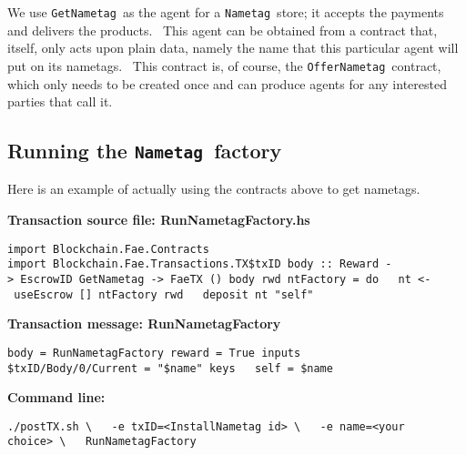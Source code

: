 \documentclass[11pt]{article}
\newcommand{\codeblock}[1]{\begin{mdframed}[
    backgroundcolor=header-color,
    linecolor=header-color,
    innertopmargin=10pt,
    ]{\texttt{#1}}\end{mdframed}}
\begin{document}

\vspace{11pt}

We use \texttt{GetNametag} as the agent for a \texttt{Nametag} store; it accepts the payments and delivers the products.  This agent can be obtained from a contract that, itself, only acts upon plain data, namely the name that this particular agent will put on its nametags.  This contract is, of course, the \texttt{OfferNametag} contract, which only needs to be created once and can produce agents for any interested parties that call it.

\subsection{Running the \texttt{Nametag} factory}
\vspace{5.5pt}

Here is an example of actually using the contracts above to get nametags.


\vspace{11pt}

\textbf{Transaction source file: RunNametagFactory.hs}

\codeblock{import Blockchain.Fae.Contracts\newline
import Blockchain.Fae.Transactions.TX\$txID\newline
\newline
body :: Reward -\textgreater{} EscrowID GetNametag -\textgreater{} FaeTX ()\newline
body rwd ntFactory = do\newline
  nt \textless{}- useEscrow {[}{]} ntFactory rwd\newline
  deposit nt "self"}

\textbf{Transaction message: RunNametagFactory}

\codeblock{body = RunNametagFactory\newline
reward = True\newline
inputs\newline
  \$txID\slash{}Body\slash{}0\slash{}Current = "\$name"\newline
keys\newline
  self = \$name}

\textbf{Command line:}

\codeblock{.\slash{}postTX.sh \textbackslash{}\newline
  -e txID=\textless{}InstallNametag id\textgreater{} \textbackslash{}\newline
  -e name=\textless{}your choice\textgreater{} \textbackslash{}\newline
  RunNametagFactory}
\end{document}
